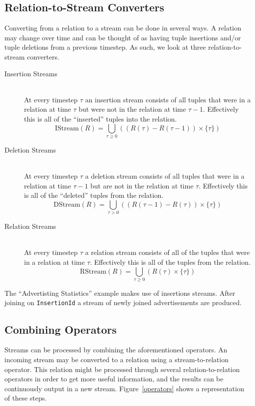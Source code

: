\documentclass[a4paper, 10pt, conference]{IEEEconf}
\begin{document}
\subsection{Relation-to-Stream Converters}
Converting from a relation to a stream can be done in several ways.  A relation may change over time and can be thought of as having tuple insertions and/or tuple deletions from a previous timestep.  As such, we look at three relation-to-stream converters.  

\begin{description}
    \item[Insertion Streams] \hfill \\
    At every timestep $\tau$ an insertion stream consists of all tuples that were in a relation at time $\tau$ but were not in the relation at time $\tau - 1$.  Effectively this is all of the ``inserted'' tuples into the relation.
    $$\text{IStream}(R) = \bigcup_{\tau \geq 0} ((R(\tau) - R(\tau - 1)) \times \{\tau\})$$

    \item[Deletion Streams] \hfill \\
    At every timestep $\tau$ a deletion stream consists of all tuples that were in a relation at time $\tau - 1$ but are not in the relation at time $\tau$. Effectively this is all of the ``deleted'' tuples from the relation. 
    $$\text{DStream}(R) = \bigcup_{\tau > 0} ((R(\tau - 1) - R(\tau)) \times \{\tau\})$$

    \item[Relation Streams] \hfill \\
    At every timestep $\tau$ a relation stream consists of all of the tuples that were in a relation at time $\tau$.  Effectively this is all of the tuples from the relation.
    $$\text{RStream}(R) = \bigcup_{\tau \geq 0} (R(\tau) \times \{\tau\})$$

\end{description}

The ``Advertisting Statistics'' example makes use of insertions streams.  After joining on \texttt{InsertionId} a stream of newly joined advertisements are produced.

\subsection{Combining Operators}
Streams can be processed by combining the aforementioned operators.  An incoming stream may be converted to a relation using a stream-to-relation operator.  This relation might be processed through several relation-to-relation operators in order to get more useful information, and the results can be continuously output in a new stream.  Figure~\ref{operators} shows a representation of these steps.
\end{document}
